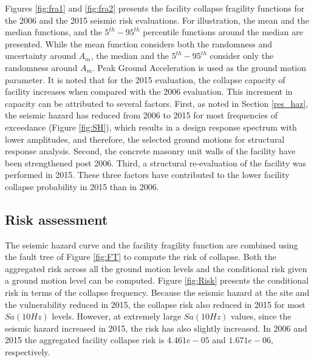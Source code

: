 \documentclass[3p]{elsarticle}
\begin{document}
Figures \ref{fig:fra1} and \ref{fig:fra2} presents the facility collapse fragility functions for the 2006 and the 2015 seismic risk evaluations. For illustration, the mean and the median functions, and the $5^{th}-95^{th}$ percentile functions around the median are presented. While the mean function considers both the randomness and uncertainty around $A_m$, the median and the $5^{th}-95^{th}$ consider only the randomness around $A_m$. Peak Ground Acceleration is used as the ground motion parameter. It is noted that for the 2015 evaluation, the collapse capacity of facility increases when compared with the 2006 evaluation. This increment in capacity can be attributed to several factors. First, as noted in Section \ref{res_haz}, the seismic hazard has reduced from 2006 to 2015 for most frequencies of exceedance (Figure \ref{fig:SH}), which results in a design response spectrum with lower amplitudes, and therefore, the selected ground motions for structural response analysis. Second, the concrete masonry unit walls of the facility have been strengthened post 2006. Third, a structural re-evaluation of the facility was performed in 2015. These three factors have contributed to the lower facility collapse probability in 2015 than in 2006.      

\subsection{Risk assessment}

The seismic hazard curve and the facility fragility function are combined using the fault tree of Figure \ref{fig:FT} to compute the risk of collapse. Both the aggregated risk across all the ground motion levels and the conditional risk given a ground motion level can be computed. Figure \ref{fig:Risk} presents the conditional risk in terms of the collapse frequency. Because the seismic hazard at the site and the vulnerability reduced in 2015, the collapse risk also reduced in 2015 for most $Sa(10Hz)$ levels. However, at extremely large $Sa(10Hz)$ values, since the seismic hazard increased in 2015, the risk has also slightly increased. In 2006 and 2015 the aggregated facility collapse risk is $4.461e-05$ and $1.671e-06$, respectively.
\end{document}
